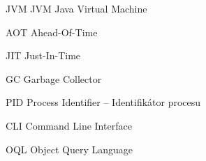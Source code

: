 \begin{seznamzkratek}{JVM}
		{JVM}
		{Java Virtual Machine}

		{AOT}
		{Ahead-Of-Time}

		{JIT}
		{Just-In-Time}
	
		{GC}
		{Garbage Collector}
	
		{PID}
		{Process Identifier -- Identifikátor procesu}

		{CLI}
		{Command Line Interface}

		{OQL}
		{Object Query Language}
\end{seznamzkratek}
